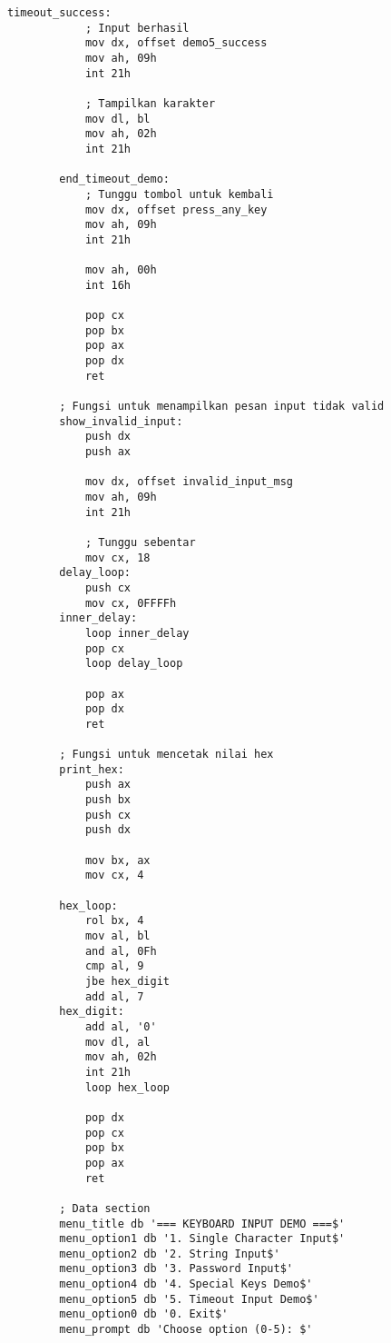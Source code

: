 \documentclass[../main.tex]{subfiles}
\begin{document}
\begin{lstlisting}[language={[x86masm]Assembler}, caption=Program Lengkap - Keyboard Input Demo, label={lst:complete-demo}]
        timeout_success:
            ; Input berhasil
            mov dx, offset demo5_success
            mov ah, 09h
            int 21h
            
            ; Tampilkan karakter
            mov dl, bl
            mov ah, 02h
            int 21h
            
        end_timeout_demo:
            ; Tunggu tombol untuk kembali
            mov dx, offset press_any_key
            mov ah, 09h
            int 21h
            
            mov ah, 00h
            int 16h
            
            pop cx
            pop bx
            pop ax
            pop dx
            ret
        
        ; Fungsi untuk menampilkan pesan input tidak valid
        show_invalid_input:
            push dx
            push ax
            
            mov dx, offset invalid_input_msg
            mov ah, 09h
            int 21h
            
            ; Tunggu sebentar
            mov cx, 18
        delay_loop:
            push cx
            mov cx, 0FFFFh
        inner_delay:
            loop inner_delay
            pop cx
            loop delay_loop
            
            pop ax
            pop dx
            ret
        
        ; Fungsi untuk mencetak nilai hex
        print_hex:
            push ax
            push bx
            push cx
            push dx
            
            mov bx, ax
            mov cx, 4
            
        hex_loop:
            rol bx, 4
            mov al, bl
            and al, 0Fh
            cmp al, 9
            jbe hex_digit
            add al, 7
        hex_digit:
            add al, '0'
            mov dl, al
            mov ah, 02h
            int 21h
            loop hex_loop
            
            pop dx
            pop cx
            pop bx
            pop ax
            ret
        
        ; Data section
        menu_title db '=== KEYBOARD INPUT DEMO ===$'
        menu_option1 db '1. Single Character Input$'
        menu_option2 db '2. String Input$'
        menu_option3 db '3. Password Input$'
        menu_option4 db '4. Special Keys Demo$'
        menu_option5 db '5. Timeout Input Demo$'
        menu_option0 db '0. Exit$'
        menu_prompt db 'Choose option (0-5): $'
        

\end{lstlisting}
\end{document}

